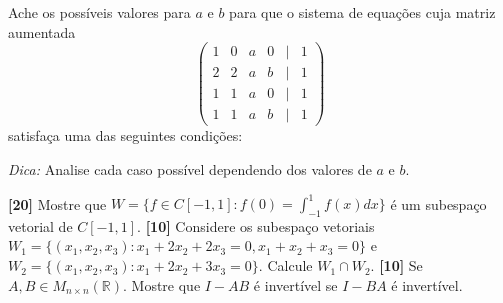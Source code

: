 \documentclass[11pt]{exam}
\begin{document}
\begin{questions}
  \question
  Ache os possíveis valores para $a$ e $b$ para que o sistema de equações cuja matriz aumentada 
       $$
       \begin{pmatrix}
       1 & 0 & a & 0 &|& 1\\
       2 & 2 & a & b &|& 1\\
       1 & 1 & a & 0 &|& 1\\
       1 & 1 & a & b &|& 1
       \end{pmatrix}
       $$
   satisfaça uma das seguintes condições:    
    
   {\it Dica:} Analise cada caso possível dependendo dos valores de $a$ e $b$.    
  
  \question
 
  \question
   {\bf [20]} Mostre que $W=\{f \in C[-1,1] : f(0)= \int_{-1}^{1} f(x)dx \}$
   é um subespaço vetorial de $C[-1,1]$. 
   \question 
   {\bf [10]} Considere os subespaço vetoriais $W_1=\{(x_1,x_2,x_3): x_1+2x_2+2x_3=0, x_1+x_2+x_3=0\}$
   e $W_2=\{(x_1,x_2,x_3): x_1+2x_2+3x_3=0 \}$. Calcule $W_1\cap W_2$.
   \question
   {\bf [10]}
   Se $A, B \in M_{n\times n}(\mathbb{R})$. Mostre
   que $I-AB$ é invertível se $I-BA$ é invertível.
\end{questions}
\end{document}

